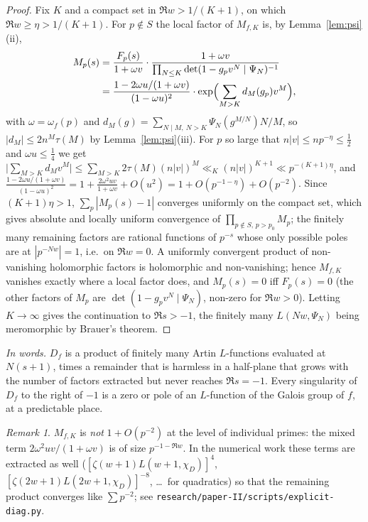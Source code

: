 \documentclass[11pt,a4paper]{article}
\theoremstyle{remark}\newtheorem{remark}[theorem]{Remark}
\begin{document}
\begin{proof}
Fix $K$ and a compact set in $\Re w>1/(K+1)$, on which $\Re w\ge\eta>1/(K+1)$. For $p\notin S$ the local
factor of $M_{f,K}$ is, by Lemma~\ref{lem:psi}(ii),
\[
\begin{aligned}
M_p(s)&=\frac{F_p(s)}{1+\omega v}\cdot\frac{1+\omega v}{\prod_{N\le K}\det(1-g_pv^N\mid\Psi_N)^{-1}}\\
&=\frac{1-2\omega u/(1+\omega v)}{(1-\omega u)^2}\cdot\exp\Bigl(\sum_{M>K}d_M(g_p)v^M\Bigr),
\end{aligned}
\]
with $\omega=\omega_f(p)$ and $d_M(g)=\sum_{N\mid M,\ N>K}\Psi_N(g^{M/N})N/M$, so $|d_M|\le2n^M\tau(M)$ by
Lemma~\ref{lem:psi}(iii). For $p$ so large that $n|v|\le n p^{-\eta}\le\tfrac12$ and $\omega u\le\tfrac14$
we get $\bigl|\sum_{M>K}d_Mv^M\bigr|\le\sum_{M>K}2\tau(M)(n|v|)^M\ll_K(n|v|)^{K+1}\ll p^{-(K+1)\eta}$, and
$\frac{1-2\omega u/(1+\omega v)}{(1-\omega u)^2}=1+\frac{2\omega^2uv}{1+\omega v}+O(u^2)=1+O(p^{-1-\eta})+O(p^{-2})$.
Since $(K+1)\eta>1$, $\sum_p|M_p(s)-1|$ converges uniformly on the compact set, which gives absolute and
locally uniform convergence of $\prod_{p\notin S,\,p>p_0}M_p$; the finitely many remaining factors are
rational functions of $p^{-s}$ whose only possible poles are at $|p^{-Nw}|=1$, i.e.\ on $\Re w=0$. A
uniformly convergent product of non-vanishing holomorphic factors is holomorphic and non-vanishing; hence
$M_{f,K}$ vanishes exactly where a local factor does, and $M_p(s)=0$ iff $F_p(s)=0$ (the other factors of
$M_p$ are $\det(1-g_pv^N\mid\Psi_N)$, non-zero for $\Re w>0$). Letting $K\to\infty$ gives the
continuation to $\Re s>-1$, the finitely many $L(Nw,\Psi_N)$ being meromorphic by Brauer's theorem.
\end{proof}

\emph{In words.} $D_f$ is a product of finitely many Artin $L$-functions evaluated at $N(s+1)$, times a
remainder that is harmless in a half-plane that grows with the number of factors extracted but never
reaches $\Re s=-1$. Every singularity of $D_f$ to the right of $-1$ is a zero or pole of an $L$-function of the
Galois group of $f$, at a predictable place.

\begin{remark}
$M_{f,K}$ is \emph{not} $1+O(p^{-2})$ at the level of individual primes: the mixed term $2\omega^2uv/(1+\omega v)$
is of size $p^{-1-\Re w}$. In the numerical work these terms are extracted as well
($[\zeta(w+1)L(w+1,\chi_D)]^4$, $[\zeta(2w+1)L(2w+1,\chi_D)]^{-8}$, \dots\ for quadratics) so that the
remaining product converges like $\sum p^{-2}$; see \texttt{research/paper-II/scripts/explicit-diag.py}.
\end{remark}
\end{document}
